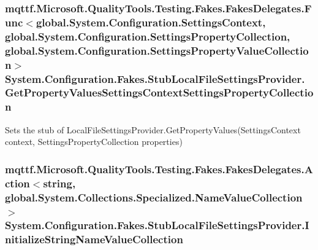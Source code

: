 \hypertarget{class_system_1_1_configuration_1_1_fakes_1_1_stub_local_file_settings_provider_a7809a11eb929f3d2ff2134dfc2c04e25}{
\subsubsection[{Get\-Property\-Values\-Settings\-Context\-Settings\-Property\-Collection}]{\setlength{\rightskip}{0pt plus 5cm}mqttf.\-Microsoft.\-Quality\-Tools.\-Testing.\-Fakes.\-Fakes\-Delegates.\-Func$<$global.\-System.\-Configuration.\-Settings\-Context, global.\-System.\-Configuration.\-Settings\-Property\-Collection, global.\-System.\-Configuration.\-Settings\-Property\-Value\-Collection$>$ System.\-Configuration.\-Fakes.\-Stub\-Local\-File\-Settings\-Provider.\-Get\-Property\-Values\-Settings\-Context\-Settings\-Property\-Collection}}\label{class_system_1_1_configuration_1_1_fakes_1_1_stub_local_file_settings_provider_a7809a11eb929f3d2ff2134dfc2c04e25}


Sets the stub of Local\-File\-Settings\-Provider.\-Get\-Property\-Values(\-Settings\-Context context, Settings\-Property\-Collection properties)

\hypertarget{class_system_1_1_configuration_1_1_fakes_1_1_stub_local_file_settings_provider_a25a59166700a4425e1921f0f4e327989}{
\subsubsection[{Initialize\-String\-Name\-Value\-Collection}]{\setlength{\rightskip}{0pt plus 5cm}mqttf.\-Microsoft.\-Quality\-Tools.\-Testing.\-Fakes.\-Fakes\-Delegates.\-Action$<$string, global.\-System.\-Collections.\-Specialized.\-Name\-Value\-Collection$>$ System.\-Configuration.\-Fakes.\-Stub\-Local\-File\-Settings\-Provider.\-Initialize\-String\-Name\-Value\-Collection}}\label{class_system_1_1_configuration_1_1_fakes_1_1_stub_local_file_settings_provider_a25a59166700a4425e1921f0f4e327989}


